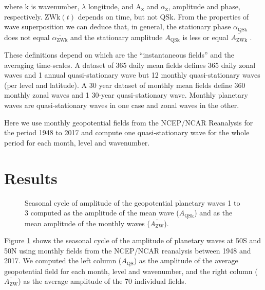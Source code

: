 \documentclass[draft,linenumbers]{agujournal2018}
\begin{document}
where \(\mathrm{k}\) is wavenumber, \(\lambda\) longitude, and
\(\mathrm{A_{x}}\) and \(\alpha_\mathrm{x}\), amplitude and phase,
respectively. \(\mathrm{ZWk}(t)\) depends on time, but not
\(\mathrm{QSk}\). From the properties of wave superposition we can
deduce that, in general, the stationary phase \(\alpha_\mathrm{QSk}\)
does not equal \(\overline{\alpha_\mathrm{ZWk}}\) and the stationary
amplitude \(A_\mathrm{QSk}\) is less or equal
\(\overline{A_\mathrm{ZWk}}\) \citep{Pain2005}.

These definitions depend on which are the ``instantaneous fields'' and
the averaging time-scales. A dataset of 365 daily mean fields defines
365 daily zonal waves and 1 annual quasi-stationary wave but 12 monthly
quasi-stationary waves (per level and latitude). A 30 year dataset of
monthly mean fields define 360 monthly zonal waves and 1 30-year
quasi-stationary wave. Monthly planetary waves are quasi-stationary
waves in one case and zonal waves in the other.

Here we use monthly geopotential fields from the NCEP/NCAR Reanalysis
\citep{Kalnay1996} for the period 1948 to 2017 and compute one
quasi-stationary wave for the whole period for each month, level and
wavenumber.

\section{Results}

\begin{figure}[h]

{\centering {}\newline{}

}

\caption{Seasonal cycle of amplitude of the geopotential planetary waves 1 to 3 computed as the amplitude of the mean wave ($A_\mathrm{QSk}$) and as the mean amplitude of the monthly waves ($\overline{A_\mathrm{ZW} }$).}\label{fig:rao}
\end{figure}

Figure \ref{fig:rao} shows the seasonal cycle of the amplitude of
planetary waves at 50\degree S and 50\degree N using monthly fields from
the NCEP/NCAR reanalysis \citep{Kalnay1996} between 1948 and 2017. We
computed the left column (\(A_\mathrm{QS}\)) as the amplitude of the
average geopotential field for each month, level and wavenumber, and the
right column (\(\overline{A_\mathrm{ZW}}\)) as the average amplitude of
the 70 individual fields.
\end{document}
